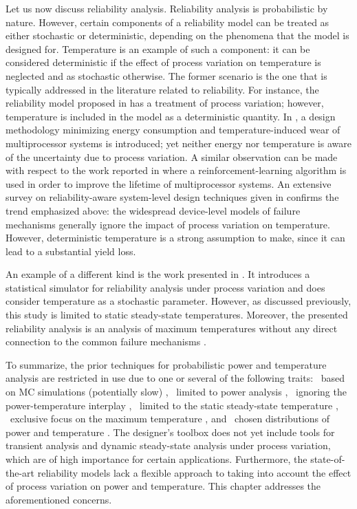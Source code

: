 Let us now discuss reliability analysis. Reliability analysis is probabilistic
by nature. However, certain components of a reliability model can be treated as
either stochastic or deterministic, depending on the phenomena that the model is
designed for. Temperature is an example of such a component: it can be
considered deterministic if the effect of process variation on temperature is
neglected and as stochastic otherwise. The former scenario is the one that is
typically addressed in the literature related to reliability. For instance, the
reliability model proposed in \cite{xiang2010} has a treatment of process
variation; however, temperature is included in the model as a deterministic
quantity. In \cite{das2014a}, a design methodology minimizing energy consumption
and temperature-induced wear of multiprocessor systems is introduced; yet
neither energy nor temperature is aware of the uncertainty due to process
variation. A similar observation can be made with respect to the work reported
in \cite{das2014c} where a reinforcement-learning algorithm is used in order to
improve the lifetime of multiprocessor systems. An extensive survey on
reliability-aware system-level design techniques given in \cite{das2014b}
confirms the trend emphasized above: the widespread device-level models of
failure mechanisms generally ignore the impact of process variation on
temperature. However, deterministic temperature is a strong assumption to make,
since it can lead to a substantial yield loss.

An example of a different kind is the work presented in \cite{lee2013}. It
introduces a statistical simulator for reliability analysis under process
variation and does consider temperature as a stochastic parameter. However, as
discussed previously, this study is limited to static steady-state temperatures.
Moreover, the presented reliability analysis is an analysis of maximum
temperatures without any direct connection to the common failure mechanisms
\cite{jedec2016}.

To summarize, the prior techniques for probabilistic power and temperature
analysis are restricted in use due to one or several of the following traits:
\one~based on \ac{MC} simulations (potentially slow) \cite{chandra2010},
\two~limited to power analysis \cite{bhardwaj2006, ghanta2006, vrudhula2006,
bhardwaj2008, shen2009, chandra2010}, \three~ignoring the power-temperature
interplay \cite{bhardwaj2006, ghanta2006, vrudhula2006, bhardwaj2008,
huang2009a, shen2009}, \four~limited to the static steady-state temperature
\cite{huang2009a, juan2011, juan2012, lee2013}, \five~exclusive focus on the
maximum temperature \cite{juan2011}, and \six~\apriori chosen distributions of
power and temperature \cite{bhardwaj2006, srivastava2010, juan2012}. The
designer's toolbox does not yet include tools for transient analysis and dynamic
steady-state analysis under process variation, which are of high importance for
certain applications. Furthermore, the state-of-the-art reliability models lack
a flexible approach to taking into account the effect of process variation on
power and temperature. This chapter addresses the aforementioned concerns.
